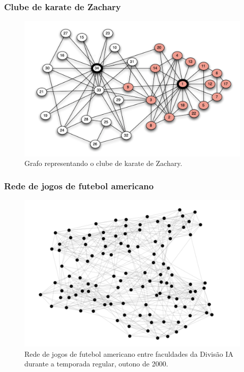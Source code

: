 \documentclass{beamer}
\begin{document}
        \begin{frame}
            \frametitle{Clube de karate de Zachary}
            \begin{figure}
                \centering
                \includegraphics[scale=0.3]{karate-club-network.png}
                \caption{Grafo representando o clube de karate de Zachary.}
            \end{figure}
        \end{frame}

        \begin{frame}
            \frametitle{Rede de jogos de futebol americano}
            \begin{figure}
                \centering
                \includegraphics[scale=0.3]{american-football.png}
                \caption{Rede de jogos de futebol americano entre faculdades da Divisão IA durante a temporada regular, outono de 2000.}
            \end{figure}
        \end{frame}
\end{document}
